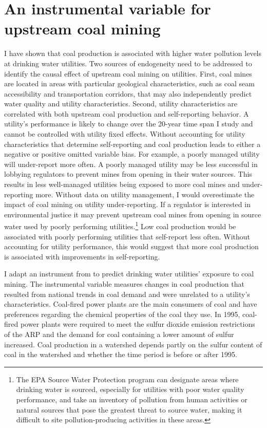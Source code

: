 \documentclass[12pt]{article}
\begin{document}
\section{An instrumental variable for upstream coal mining}\label{sec:iv}

I have shown that coal production is associated with higher water pollution levels at drinking water utilities. Two sources of endogeneity need to be addressed to identify the causal effect of upstream coal mining on utilities. First, coal mines are located in areas with particular geological characteristics, such as coal seam accessibility and transportation corridors, that may also independently predict water quality and utility characteristics. Second, utility characteristics are correlated with both upstream coal production and self-reporting behavior. A utility's performance is likely to change over the 20-year time span I study and cannot be controlled with utility fixed effects. Without accounting for utility characteristics that determine self-reporting and coal production leads to either a negative or positive omitted variable bias. For example, a poorly managed utility will under-report more often. A poorly managed utility may be less successful in lobbying regulators to prevent mines from opening in their water sources. This results in less well-managed utilities being exposed to more coal mines and under-reporting more. Without data on utility management, I would overestimate the impact of coal mining on utility under-reporting. If a regulator is interested in environmental justice it may prevent upstream coal mines from opening in source water used by poorly performing utilities.\footnote{The EPA Source Water Protection program can designate areas where drinking water is sourced, especially for utilities with poor water quality performance, and take an inventory of pollution from human activities or natural sources that pose the greatest threat to source water, making it difficult to site pollution-producing activities in these areas.} Low coal production would be associated with poorly performing utilities that self-report less often. Without accounting for utility performance, this would suggest that more coal production is associated with improvements in self-reporting.

I adapt an instrument from \textcite{stratford2015coalprod} to predict drinking water utilities' exposure to coal mining. The instrumental variable measures changes in coal production that resulted from national trends in coal demand and were unrelated to a utility's characteristics. Coal-fired power plants are the main consumers of coal and have preferences regarding the chemical properties of the coal they use. In 1995, coal-fired power plants were required to meet the sulfur dioxide emission restrictions of the ARP and the demand for coal containing a lower amount of sulfur increased. Coal production in a watershed depends partly on the sulfur content of coal in the watershed and whether the time period is before or after 1995. 
\end{document}
